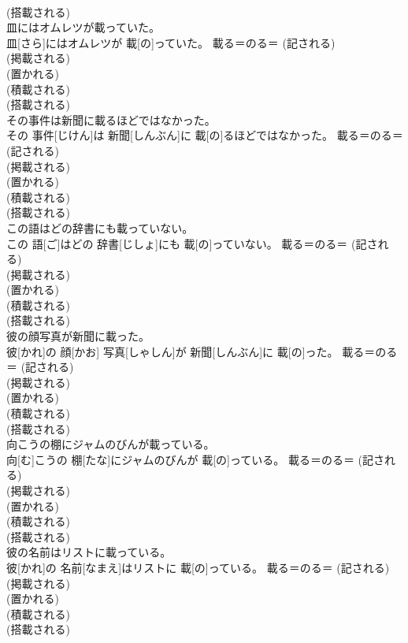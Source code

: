 \documentclass[8pt]{extreport}
\begin{document}
\begin{CJK}{UTF8}{min}
{\\	(搭載される) 
\\	皿にはオムレツが載っていた。	
\\	皿[さら]にはオムレツが 載[の]っていた。	載る＝のる＝ (記される) 
\\	(掲載される) 
\\	(置かれる) 
\\	(積載される) 
\\	(搭載される) 
\\	その事件は新聞に載るほどではなかった。	
\\	その 事件[じけん]は 新聞[しんぶん]に 載[の]るほどではなかった。	載る＝のる＝ (記される) 
\\	(掲載される) 
\\	(置かれる) 
\\	(積載される) 
\\	(搭載される) 
\\	この語はどの辞書にも載っていない。	
\\	この 語[ご]はどの 辞書[じしょ]にも 載[の]っていない。	載る＝のる＝ (記される) 
\\	(掲載される) 
\\	(置かれる) 
\\	(積載される) 
\\	(搭載される) 
\\	彼の顔写真が新聞に載った。	
\\	彼[かれ]の 顔[かお] 写真[しゃしん]が 新聞[しんぶん]に 載[の]った。	載る＝のる＝ (記される) 
\\	(掲載される) 
\\	(置かれる) 
\\	(積載される) 
\\	(搭載される) 
\\	向こうの棚にジャムのびんが載っている。	
\\	向[む]こうの 棚[たな]にジャムのびんが 載[の]っている。	載る＝のる＝ (記される) 
\\	(掲載される) 
\\	(置かれる) 
\\	(積載される) 
\\	(搭載される) 
\\	彼の名前はリストに載っている。	
\\	彼[かれ]の 名前[なまえ]はリストに 載[の]っている。	載る＝のる＝ (記される) 
\\	(掲載される) 
\\	(置かれる) 
\\	(積載される) 
\\	(搭載される) 
}
\end{CJK}
\end{document}
